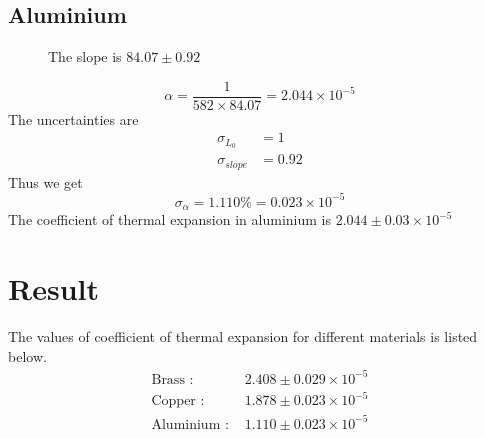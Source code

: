 \documentclass[12pt]{article}
\newlength\fwidth
\newlength\fheight
\begin{document}
\subsection*{Aluminium}
\begin{figure}[H]
    \centering
    \setlength{}
    \setlength{}
    
    \caption{The slope is $84.07\pm0.92$}
\end{figure}
\[\alpha = \frac{1}{582\times 84.07} = 2.044\times 10^{-5}\]
The uncertainties are
\begin{align*}
    \sigma_{L_0} &= 1 \\
    \sigma_{slope} &= 0.92
\end{align*}
Thus we get
\[\sigma_\alpha = 1.110\% = 0.023\times10^{-5}\]
The coefficient of thermal expansion in aluminium is $2.044\pm 0.03 \times 10^{-5}$
\section*{Result}
The values of coefficient of thermal expansion for different materials is listed below.
\begin{align*}
    \text{Brass : }&2.408\pm 0.029 \times 10^{-5} \\
    \text{Copper : }&1.878\pm 0.023 \times 10^{-5} \\
    \text{Aluminium : }&1.110\pm 0.023 \times 10^{-5}
\end{align*}
\end{document}
